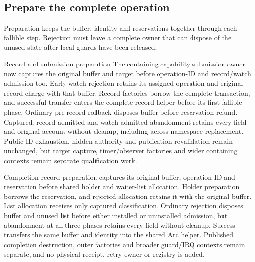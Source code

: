 \subsection{Prepare the complete operation}

Preparation keeps the buffer, identity and reservations together through each
fallible step. Rejection must leave a complete owner that can dispose of the
unused state after local guards have been released.

\begin{implementationdetail}{Record and submission preparation}
The containing capability-submission owner now captures the original buffer
and target before operation-ID and record/watch admission too. Early watch
rejection retains its assigned operation and original record charge with that
buffer. Record factories borrow the complete transaction, and successful transfer
enters the complete-record helper before its first fallible phase. Ordinary
pre-record rollback disposes buffer before reservation refund. Captured,
record-admitted and watch-admitted abandonment retains every field and original
account without cleanup, including across namespace replacement. Public ID
exhaustion, hidden authority and publication revalidation remain unchanged, but
target capture, timer/observer factories and wider containing contexts remain
separate qualification work.

Completion record preparation captures its original buffer, operation ID and
reservation before shared holder and waiter-list allocation. Holder preparation
borrows the reservation, and rejected allocation retains it with the original
buffer. List allocation receives only captured classification. Ordinary
rejection disposes buffer and unused list before either installed or uninstalled
admission, but abandonment at all three phases retains every field without cleanup.
Success transfers the same buffer and identity into the shared Arc helper.
Published completion destruction, outer factories and broader guard/IRQ contexts
remain separate, and no physical receipt, retry owner or registry is added.
\end{implementationdetail}

